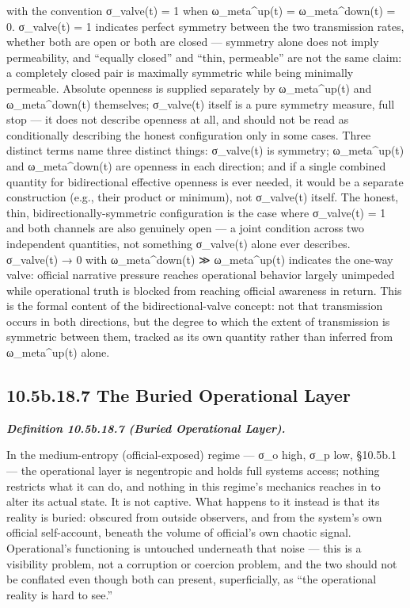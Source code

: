 \documentclass[
]{article}
\begin{document}
with the convention σ\_valve(t) = 1 when ω\_meta\^{}up(t) =
ω\_meta\^{}down(t) = 0. σ\_valve(t) = 1 indicates perfect symmetry
between the two transmission rates, whether both are open or both are
closed --- symmetry alone does not imply permeability, and ``equally
closed'' and ``thin, permeable'' are not the same claim: a completely
closed pair is maximally symmetric while being minimally permeable.
Absolute openness is supplied separately by ω\_meta\^{}up(t) and
ω\_meta\^{}down(t) themselves; σ\_valve(t) itself is a pure symmetry
measure, full stop --- it does not describe openness at all, and should
not be read as conditionally describing the honest configuration only in
some cases. Three distinct terms name three distinct things: σ\_valve(t)
is symmetry; ω\_meta\^{}up(t) and ω\_meta\^{}down(t) are openness in
each direction; and if a single combined quantity for bidirectional
effective openness is ever needed, it would be a separate construction
(e.g., their product or minimum), not σ\_valve(t) itself. The honest,
thin, bidirectionally-symmetric configuration is the case where
σ\_valve(t) = 1 and both channels are also genuinely open --- a joint
condition across two independent quantities, not something σ\_valve(t)
alone ever describes. σ\_valve(t) → 0 with ω\_meta\^{}down(t) ≫
ω\_meta\^{}up(t) indicates the one-way valve: official narrative
pressure reaches operational behavior largely unimpeded while
operational truth is blocked from reaching official awareness in return.
This is the formal content of the bidirectional-valve concept: not that
transmission occurs in both directions, but the degree to which the
extent of transmission is symmetric between them, tracked as its own
quantity rather than inferred from ω\_meta\^{}up(t) alone.

\hypertarget{b.18.7-the-buried-operational-layer}{%
\subsection{10.5b.18.7 The Buried Operational
Layer}\label{b.18.7-the-buried-operational-layer}}

\emph{\textbf{Definition 10.5b.18.7 (Buried Operational Layer).}}

In the medium-entropy (official-exposed) regime --- σ\_o high, σ\_p low,
§10.5b.1 --- the operational layer is negentropic and holds full systems
access; nothing restricts what it can do, and nothing in this regime's
mechanics reaches in to alter its actual state. It is not captive. What
happens to it instead is that its reality is buried: obscured from
outside observers, and from the system's own official self-account,
beneath the volume of official's own chaotic signal. Operational's
functioning is untouched underneath that noise --- this is a visibility
problem, not a corruption or coercion problem, and the two should not be
conflated even though both can present, superficially, as ``the
operational reality is hard to see.''
\end{document}
